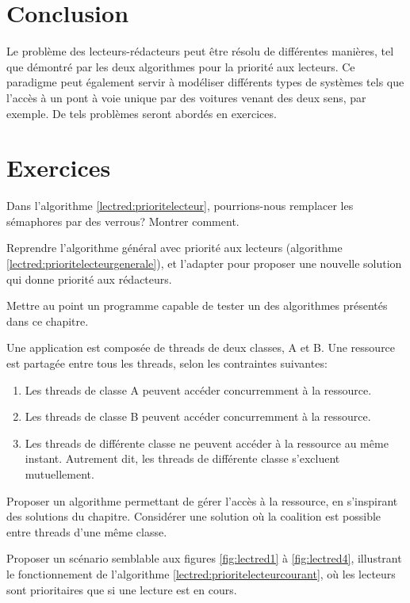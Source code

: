 \section{Conclusion}

Le problème des lecteurs-rédacteurs peut être résolu de différentes manières, tel que démontré par les deux algorithmes pour la priorité aux lecteurs. Ce paradigme peut également servir à modéliser différents types de systèmes tels que l'accès à un pont à voie unique par des voitures venant des deux sens, par exemple. De tels problèmes seront abordés en exercices.


\section{Exercices}

\startexercice

Dans l'algorithme \ref{lectred:prioritelecteur}, pourrions-nous remplacer les sémaphores par des verrous? Montrer comment.

\startexercice

Reprendre l'algorithme général avec priorité aux lecteurs (algorithme \ref{lectred:prioritelecteurgenerale}), et l'adapter pour proposer une nouvelle solution qui donne priorité aux rédacteurs.

\startexercice

Mettre au point un programme capable de tester un des algorithmes présentés dans ce chapitre.

\startexercice

Une application est composée de threads de deux classes, A et B. Une ressource est partagée entre tous les threads, selon les contraintes suivantes:
\begin{enumerate}
\item Les threads de classe A peuvent accéder concurremment  à la ressource.
\item Les threads de classe B peuvent accéder concurremment à la ressource.
\item Les threads de différente classe ne peuvent accéder à la ressource au même instant. Autrement dit, les threads de différente classe s'excluent mutuellement.
\end{enumerate}

Proposer un algorithme permettant de gérer l'accès à la ressource, en s'inspirant des solutions du chapitre. Considérer une solution où la coalition est possible entre threads d'une même classe.


\startexercice

Proposer un scénario semblable aux figures \ref{fig:lectred1} à \ref{fig:lectred4}, illustrant le fonctionnement de l'algorithme
\ref{lectred:prioritelecteurcourant}, où les lecteurs sont prioritaires que si une lecture est en cours.
